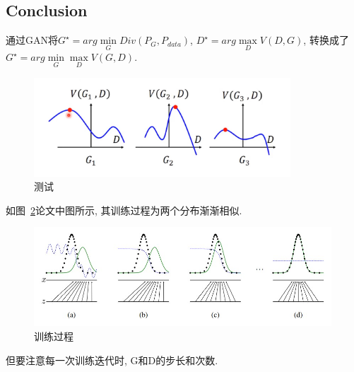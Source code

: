 \subsection{Conclusion}
通过GAN将$G^{\star} = arg \min \limits_{G} Div(P_{G}, P_{data})$, $D^{\star} = arg \max \limits_{D} V(D,G)$, 转换成了$G^{\star} = arg \min \limits_{G} \max \limits_{D} V(G, D)$. 

\begin{figure}[!htbp]
    \centering
    \includegraphics[height=10em]{pic/pic0302.jpg}
    \caption{测试}
    \label{fig:0302}
\end{figure}


如图~\ref{fig:0301}论文中图所示, 其训练过程为两个分布渐渐相似. 
\begin{figure}[!htbp]
    \centering
    \includegraphics[height=10em]{pic/pic0301.jpg}
    \caption{训练过程}
    \label{fig:0301}
\end{figure}

但要注意每一次训练迭代时, G和D的步长和次数.



